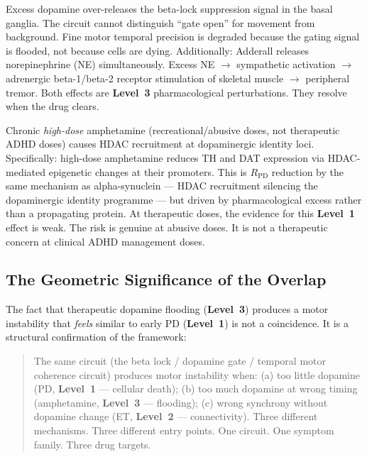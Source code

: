 \documentclass[12pt,a4paper]{article}
\newcommand{\rpd}{$R_{\mathrm{PD}}$}
\newcommand{\Lev}[1]{\textbf{Level~#1}}
\begin{document}
\begin{description}[leftmargin=2em, itemsep=0.5em]
  \item[\textbf{\Lev{3} effect (pharmacological, reversible):}]
    Excess dopamine over-releases the beta-lock suppression signal in
    the basal ganglia. The circuit cannot distinguish ``gate open'' for
    movement from background. Fine motor temporal precision is degraded
    because the gating signal is flooded, not because cells are dying.
    Additionally: Adderall releases norepinephrine (NE) simultaneously.
    Excess NE $\to$ sympathetic activation $\to$ adrenergic beta-1/beta-2
    receptor stimulation of skeletal muscle $\to$ peripheral tremor.
    Both effects are \Lev{3} pharmacological perturbations. They resolve
    when the drug clears.

  \item[\textbf{\Lev{1} effect (epigenetic, dose-dependent):}]
    Chronic \textit{high-dose} amphetamine (recreational/abusive doses,
    not therapeutic ADHD doses) causes HDAC recruitment at dopaminergic
    identity loci. Specifically: high-dose amphetamine reduces TH and DAT
    expression via HDAC-mediated epigenetic changes at their promoters.
    This is \rpd{} reduction by the same mechanism as alpha-synuclein ---
    HDAC recruitment silencing the dopaminergic identity programme ---
    but driven by pharmacological excess rather than a propagating protein.
    At therapeutic doses, the evidence for this \Lev{1} effect is weak.
    The risk is genuine at abusive doses. It is not a therapeutic concern
    at clinical ADHD management doses.
\end{description}

\subsection{The Geometric Significance of the Overlap}

The fact that therapeutic dopamine flooding (\Lev{3}) produces a motor
instability that \textit{feels} similar to early PD (\Lev{1}) is not a
coincidence. It is a structural confirmation of the framework:

\begin{quote}
The same circuit (the beta lock / dopamine gate / temporal motor coherence
circuit) produces motor instability when:
(a) too little dopamine (PD, \Lev{1} --- cellular death);
(b) too much dopamine at wrong timing (amphetamine, \Lev{3} --- flooding);
(c) wrong synchrony without dopamine change (ET, \Lev{2} --- connectivity).
Three different mechanisms. Three different entry points. One circuit.
One symptom family. Three drug targets.
\end{quote}
\end{document}
